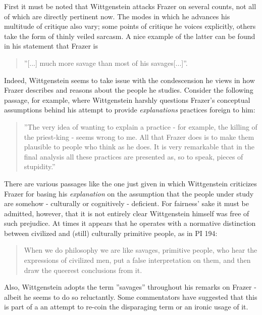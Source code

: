 \documentclass{article}
\begin{document}
First it must be noted that Wittgenstein attacks Frazer on several counts, not all of which are directly pertinent now. The modes in which he advances his multitude of critique also vary; some points of critique he voices explicitly, others take the form of thinly veiled sarcasm. A nice example of the latter can be found in his statement that Frazer is
\begin{quote}
''[...] much more savage than most of his savages[...]''.
\end{quote} %
Indeed, Wittgenstein seems to take issue with the condescension he views in how Frazer describes and reasons about the people he studies. Consider the following passage, for example, where Wittgenstein harshly questions Frazer's conceptual assumptions behind his attempt to provide \textit{explanations} practices foreign to him:
 \begin{quote}
 ''The very idea of wanting to explain a practice - for example, the killing of the priest-king - seems wrong to me. All that Frazer does is to make them plausible to people who think as he does. It is very remarkable that in the final analysis all these practices are presented as, so to speak, pieces of stupidity.''%
 \end{quote}
 There are various passages like the one just given in which Wittgenstein criticizes Frazer for basing his \textit{explanation} on the assumption that the people under study are somehow - culturally or cognitively - deficient. For fairness' sake it must be admitted, however, that it is not entirely clear Wittgenstein himself was free of such prejudice. At times it appears that he operates with a normative distinction between civilized and (still) culturally primitive people, as in PI 194:
\begin{quote}
When we do philosophy we are like savages, primitive people, who hear the expressions of civilized men, put a false interpretation on them, and then draw the queerest conclusions from it.
\end{quote}
 Also, Wittgenstein adopts the term ''savages'' throughout his remarks on Frazer - albeit he seems to do so reluctantly. Some commentators have suggested that this is part of a an attempt to re-coin the disparaging term or an ironic usage of it. %
\end{document}
